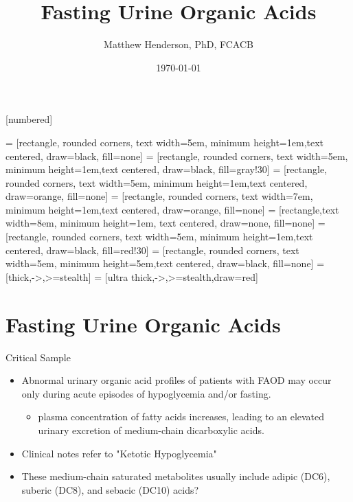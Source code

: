 \documentclass[presentation, smaller]{beamer}
\author{Matthew Henderson, PhD, FCACB}
\date{\today}
\title{Fasting Urine Organic Acids}
\institute[NSO]{Newborn Screening Ontario}
\begin{document}
\maketitle


\vspace{220pt}
\beamertemplatenavigationsymbolsempty
{}[numbered]


 = [rectangle, rounded corners, text width=5em, minimum height=1em,text centered, draw=black, fill=none]
 = [rectangle, rounded corners, text width=5em, minimum height=1em,text centered, draw=black, fill=gray!30]
 = [rectangle, rounded corners, text width=5em, minimum height=1em,text centered, draw=orange, fill=none]
 = [rectangle, rounded corners, text width=7em, minimum height=1em,text centered, draw=orange, fill=none]
 = [rectangle,text width=8em, minimum height=1em, text centered, draw=none, fill=none]
 = [rectangle, rounded corners, text width=5em, minimum height=1em,text centered, draw=black, fill=red!30]
 = [rectangle, rounded corners, text width=5em, minimum height=5em,text centered, draw=black, fill=none]
 = [thick,->,>=stealth]
 = [ultra thick,->,>=stealth,draw=red]

\section{Fasting Urine Organic Acids}
\label{sec:orgheadline14}
\begin{frame}[label={sec:orgheadline1}]{Critical Sample}
\begin{itemize}
\item Abnormal urinary organic acid profiles of patients with FAOD may
occur only during acute episodes of hypoglycemia and/or fasting.

\begin{itemize}
\item plasma concentration of fatty acids increases, leading to an
elevated urinary excretion of medium-chain dicarboxylic acids.
\end{itemize}

\item Clinical notes refer to "Ketotic Hypoglycemia"

\item These medium-chain saturated metabolites usually include adipic
(DC6), suberic (DC8), and sebacic (DC10) acids?
\end{itemize}
\end{frame}
\end{document}
